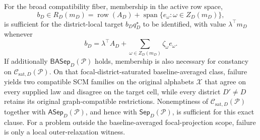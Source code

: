For the broad compatibility fiber, membership in the active row space,
\[
b_D\in R_D(m_D)
=\operatorname{row}(A_D)+\operatorname{span}\{e_\omega:\omega\in Z_D(m_D)\},
\]
is sufficient for the district-local target \(b_Dq_D^\star\) to be identified, with value \(\lambda^\top m_D\) whenever
\[
b_D=\lambda^\top A_D+\sum_{\omega\in Z_D(m_D)}\zeta_\omega e_\omega.
\]
If additionally \(\mathsf{BASep}_D(\mathcal P)\) holds, membership is also necessary for constancy on \(\mathcal C_{\mathrm{sat},D}(\mathcal P)\).  On that focal-district-saturated baseline-averaged class, failure yields two compatible SCM families on the original alphabets \(\mathcal X\) that agree on every supplied law and disagree on the target cell, while every district \(D'\ne D\) retains its original graph-compatible restrictions.  Nonemptiness of \(\mathcal C_{\mathrm{sat},D}(\mathcal P)\) together with \(\mathsf{ASep}_D(\mathcal P)\), and hence with \(\mathsf{Sep}_D(\mathcal P)\), is sufficient for this exact clause.  For a problem outside the baseline-averaged focal-projection scope, failure is only a local outer-relaxation witness.